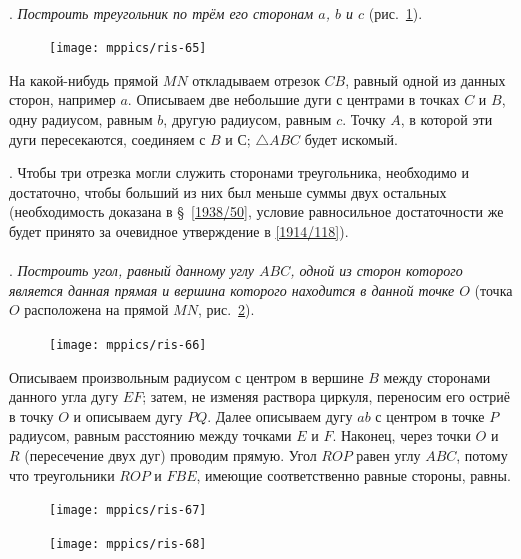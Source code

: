 \documentclass[twoside]{book}
\begin{document}
\paragraph{}\label{1938/62}
.
\emph{Построить треугольник по трём его сторонам $a$, $b$ и $c$} (рис.~\ref{1938/ris-65}).

\begin{figure}[h!]
\centering
\texttt{[image: mppics/ris-65]}
\caption{}\label{1938/ris-65}
\end{figure}

На какой-нибудь прямой $MN$ откладываем отрезок $CB$, равный одной из данных сторон, например $a$.
Описываем две небольшие дуги с центрами в точках $C$ и $B$, одну радиусом, равным $b$, другую радиусом, равным $c$.
Точку $A$, в которой эти дуги пересекаются, соединяем с $B$ и С;
$\triangle ABC$ будет искомый.

\smallskip
{}.
Чтобы три отрезка могли служить сторонами треугольника, необходимо и достаточно, чтобы больший из них был меньше суммы двух остальных (необходимость доказана в §~\ref{1938/50}, условие равносильное достаточности же будет принято за очевидное утверждение в \ref{1914/118}).

\paragraph{}\label{1938/63}
.
\emph{Построить угол, равный данному углу $ABC$, одной из сторон которого является данная прямая и вершина которого находится в данной точке $O$} (точка $O$ расположена на прямой $MN$, рис.~\ref{1938/ris-66}).

\begin{figure}[h!]
\centering
\texttt{[image: mppics/ris-66]}
\caption{}\label{1938/ris-66}
\end{figure}

Описываем произвольным радиусом с центром в вершине $B$ между сторонами данного угла дугу $EF$;
затем, не изменяя раствора циркуля, переносим его остриё в точку $O$ и описываем дугу $PQ$.
Далее описываем дугу $ab$ с центром в точке $P$ радиусом, равным расстоянию между точками $E$ и $F$.
Наконец, через точки $O$ и $R$ (пересечение двух дуг) проводим прямую.
Угол $ROP$ равен углу $ABC$, потому что треугольники $ROP$ и $FBE$, имеющие соответственно равные стороны, равны.

\begin{figure}
\vskip-4mm
\centering
\texttt{[image: mppics/ris-67]}
\caption{}\label{1938/ris-67}
\bigskip
\texttt{[image: mppics/ris-68]}
\caption{}\label{1938/ris-68}
\end{figure}
\end{document}
